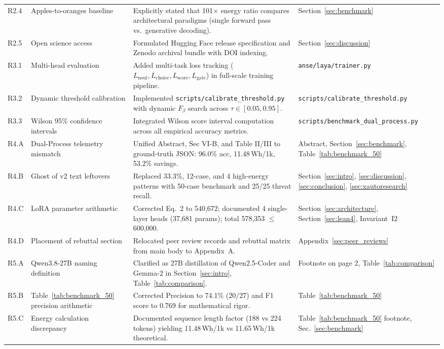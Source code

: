 \documentclass[conference]{IEEEtran}
\begin{document}
\begin{table}[htbp]
\begin{tabular}{@{}lp{4.2cm}p{5.8cm}p{4.2cm}@{}}
R2.4 & Apples-to-oranges baseline & Explicitly stated that 101$\times$ energy ratio compares architectural paradigms (single forward pass vs.\ generative decoding). & Section~\ref{sec:benchmark} \\
R2.5 & Open science access & Formulated Hugging Face release specification and Zenodo archival bundle with DOI indexing. & Section~\ref{sec:discussion} \\
R3.1 & Multi-head evaluation & Added multi-task loss tracking ($L_\text{noul}, L_\text{choice}, L_\text{score}, L_\text{gate}$) in full-scale training pipeline. & \texttt{anse/laya/trainer.py} \\
R3.2 & Dynamic threshold calibration & Implemented \texttt{scripts/calibrate\_threshold.py} with dynamic $F_\beta$ search across $\tau \in [0.05, 0.95]$. & \texttt{scripts/calibrate\_threshold.py} \\
R3.3 & Wilson 95\% confidence intervals & Integrated Wilson score interval computation across all empirical accuracy metrics. & \texttt{scripts/benchmark\_dual\_process.py} \\
R4.A & Dual-Process telemetry mismatch & Unified Abstract, Sec VI-B, and Table II/III to ground-truth JSON: 96.0\% acc, 11.48\,Wh/1k, 53.2\% savings. & Abstract, Section~\ref{sec:benchmark}, Table~\ref{tab:benchmark_50} \\
R4.B & Ghost of v2 text leftovers & Replaced 33.3\%, 12-case, and 4 high-energy patterns with 50-case benchmark and 25/25 threat recall. & Section~\ref{sec:intro}, \ref{sec:discussion}, \ref{sec:conclusion}, \ref{sec:xautoresearch} \\
R4.C & LoRA parameter arithmetic & Corrected Eq.~2 to 540,672; documented 4 single-layer heads (37,681 params); total 578,353 $\le$ 600,000. & Section~\ref{sec:architecture}, Section~\ref{sec:lean4}, Invariant~I2 \\
R4.D & Placement of rebuttal section & Relocated peer review records and rebuttal matrix from main body to Appendix~A. & Appendix~\ref{sec:peer_reviews} \\
R5.A & Qwen3.8-27B naming definition & Clarified as 27B distillation of Qwen2.5-Coder and Gemma-2 in Section~\ref{sec:intro}, Table~\ref{tab:comparison}. & Footnote on page 2, Table~\ref{tab:comparison} \\
R5.B & Table~\ref{tab:benchmark_50} precision arithmetic & Corrected Precision to 74.1\% ($20/27$) and F1 score to 0.769 for mathematical rigor. & Table~\ref{tab:benchmark_50} \\
R5.C & Energy calculation discrepancy & Documented sequence length factor (188 vs 224 tokens) yielding 11.48\,Wh/1k vs 11.65\,Wh/1k theoretical. & Table~\ref{tab:benchmark_50} footnote, Sec.~\ref{sec:benchmark} \\

\end{tabular}
\end{table}
\end{document}
